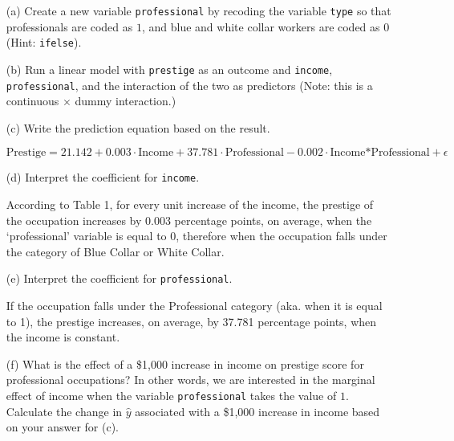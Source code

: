 \documentclass[12pt,letterpaper]{article}
\begin{document}
\newpage
\begin{enumerate}
	
	\item [(a)]
	Create a new variable \texttt{professional} by recoding the variable \texttt{type} so that professionals are coded as $1$, and blue and white collar workers are coded as $0$ (Hint: \texttt{ifelse}).
	
	
	
	\item [(b)]
	Run a linear model with \texttt{prestige} as an outcome and \texttt{income}, \texttt{professional}, and the interaction of the two as predictors (Note: this is a continuous $\times$ dummy interaction.)
	
	
	
	
	
	\item [(c)]
	Write the prediction equation based on the result.
	
	\begin{equation*}
		\text{Prestige} = 21.142 + 0.003 \cdot \text{Income} + 37.781 \cdot \text{Professional} - 0.002 \cdot  \text{Income*Professional} + \epsilon
	\end{equation*}
	
\newpage
	\item [(d)]
	Interpret the coefficient for \texttt{income}.
	
	According to Table 1, for every unit increase of the income, the prestige of the occupation increases by 0.003 percentage points, on average, when the `professional' variable is equal to 0, therefore when the occupation falls under the category of Blue Collar or White Collar. 
	
	\item [(e)]
	Interpret the coefficient for \texttt{professional}.
	
	If the occupation falls under the Professional category (aka. when it is equal to 1), the prestige increases, on average, by 37.781 percentage points, when the income is constant. 
	
	\newpage
	\item [(f)]
	What is the effect of a \$1,000 increase in income on prestige score for professional occupations? In other words, we are interested in the marginal effect of income when the variable \texttt{professional} takes the value of $1$. Calculate the change in $\hat{y}$ associated with a \$1,000 increase in income based on your answer for (c). \\


\end{enumerate}
\end{document}
